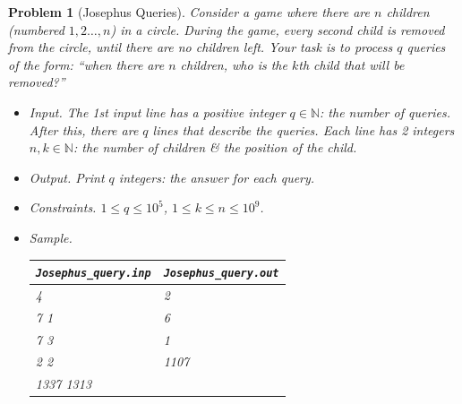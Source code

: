 \documentclass{article}
\newtheorem{problem}{Problem}
\begin{document}
\begin{problem}[Josephus Queries]
	Consider a game where there are $n$ children (numbered $1,2\ldots,n$) in a circle. During the game, every second child is removed from the circle, until there are no children left. Your task is to process $q$ queries of the form: ``when there are $n$ children, who is the $k$th child that will be removed?''	
	\begin{itemize}
		\item {\sf Input.} The 1st input line has a positive integer $q\in\mathbb{N}$: the number of queries. After this, there are $q$ lines that describe the queries. Each line has 2 integers $n,k\in\mathbb{N}$: the number of children \& the position of the child.
		\item {\sf Output.} Print $q$ integers: the answer for each query.
		\item {\sf Constraints.} $1\le q\le10^5$, $1\le k\le n\le10^9$.
		\item {\sf Sample.}
		\begin{table}[H]
			\centering
			\begin{tabular}{|l|l|}
				\hline
				\verb|Josephus_query.inp| & \verb|Josephus_query.out| \\
				\hline
				4 & 2 \\
				7 1 & 6 \\
				7 3 & 1 \\
				2 2 & 1107 \\
				1337 1313 & \\
				\hline
			\end{tabular}
		\end{table}
	\end{itemize}
\end{problem}


\printbibliography[heading=bibintoc]
\end{document}
